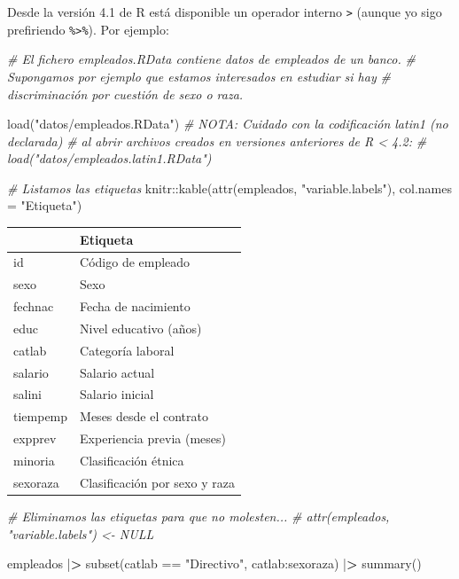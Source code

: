 \documentclass[
]{book}
\newenvironment{Shaded}{\begin{snugshade}}{\end{snugshade}}
\newcommand{\AttributeTok}[1]{\textcolor[rgb]{0.77,0.63,0.00}{#1}}
\newcommand{\CommentTok}[1]{\textcolor[rgb]{0.56,0.35,0.01}{\textit{#1}}}
\newcommand{\ErrorTok}[1]{\textcolor[rgb]{0.64,0.00,0.00}{\textbf{#1}}}
\newcommand{\FunctionTok}[1]{\textcolor[rgb]{0.00,0.00,0.00}{#1}}
\newcommand{\NormalTok}[1]{#1}
\newcommand{\SpecialCharTok}[1]{\textcolor[rgb]{0.00,0.00,0.00}{#1}}
\newcommand{\StringTok}[1]{\textcolor[rgb]{0.31,0.60,0.02}{#1}}
\theoremstyle{break}
\theoremstyle{nonumberplain}
\begin{document}
Desde la versión 4.1 de R está disponible un operador interno \texttt{\textbar{}\textgreater{}} (aunque yo sigo prefiriendo \texttt{\%\textgreater{}\%}).
Por ejemplo:

\begin{Shaded}
\begin{Highlighting}[]
\CommentTok{\# El fichero \textquotesingle{}empleados.RData\textquotesingle{} contiene datos de empleados de un banco.}
\CommentTok{\# Supongamos por ejemplo que estamos interesados en estudiar si hay}
\CommentTok{\# discriminación por cuestión de sexo o raza.}

\FunctionTok{load}\NormalTok{(}\StringTok{"datos/empleados.RData"}\NormalTok{)}
\CommentTok{\# NOTA: Cuidado con la codificación latin1 (no declarada) }
\CommentTok{\# al abrir archivos creados en versiones anteriores de R \textless{} 4.2: }
\CommentTok{\# load("datos/empleados.latin1.RData")}

\CommentTok{\# Listamos las etiquetas}
\NormalTok{knitr}\SpecialCharTok{::}\FunctionTok{kable}\NormalTok{(}\FunctionTok{attr}\NormalTok{(empleados, }\StringTok{"variable.labels"}\NormalTok{), }\AttributeTok{col.names =} \StringTok{"Etiqueta"}\NormalTok{)}
\end{Highlighting}
\end{Shaded}

\begin{tabular}{l|l}
\hline
  & Etiqueta\\
\hline
id & Código de empleado\\
\hline
sexo & Sexo\\
\hline
fechnac & Fecha de nacimiento\\
\hline
educ & Nivel educativo  (años)\\
\hline
catlab & Categoría laboral\\
\hline
salario & Salario actual\\
\hline
salini & Salario inicial\\
\hline
tiempemp & Meses desde el contrato\\
\hline
expprev & Experiencia previa (meses)\\
\hline
minoria & Clasificación étnica\\
\hline
sexoraza & Clasificación por sexo y raza\\
\hline
\end{tabular}

\begin{Shaded}
\begin{Highlighting}[]
\CommentTok{\# Eliminamos las etiquetas para que no molesten...}
\CommentTok{\# attr(empleados, "variable.labels") \textless{}{-} NULL  }

\NormalTok{empleados }\SpecialCharTok{|}\ErrorTok{\textgreater{}}  \FunctionTok{subset}\NormalTok{(catlab }\SpecialCharTok{==} \StringTok{"Directivo"}\NormalTok{, catlab}\SpecialCharTok{:}\NormalTok{sexoraza) }\SpecialCharTok{|}\ErrorTok{\textgreater{}}  \FunctionTok{summary}\NormalTok{()}
\end{Highlighting}
\end{Shaded}
\end{document}
